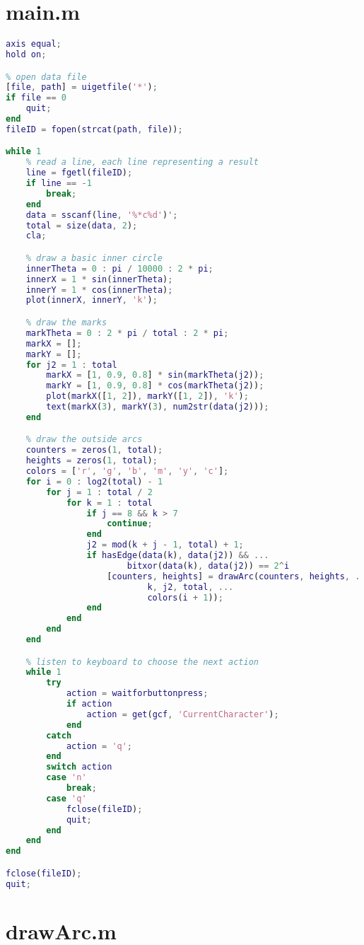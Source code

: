\label{Appendix B}

\section{main.m}
\label{Section B.1}

\begin{lstlisting}[language = Matlab]
axis equal;
hold on;

% open data file
[file, path] = uigetfile('*');
if file == 0
	quit;
end
fileID = fopen(strcat(path, file));

while 1
	% read a line, each line representing a result
	line = fgetl(fileID);
	if line == -1
		break;
	end
	data = sscanf(line, '%*c%d')';
	total = size(data, 2);
	cla;

	% draw a basic inner circle
	innerTheta = 0 : pi / 10000 : 2 * pi;
	innerX = 1 * sin(innerTheta);
	innerY = 1 * cos(innerTheta);
	plot(innerX, innerY, 'k');

	% draw the marks
	markTheta = 0 : 2 * pi / total : 2 * pi;
	markX = [];
	markY = [];
	for j2 = 1 : total
		markX = [1, 0.9, 0.8] * sin(markTheta(j2));
		markY = [1, 0.9, 0.8] * cos(markTheta(j2));
		plot(markX([1, 2]), markY([1, 2]), 'k');
		text(markX(3), markY(3), num2str(data(j2)));
	end

	% draw the outside arcs
	counters = zeros(1, total);
	heights = zeros(1, total);
	colors = ['r', 'g', 'b', 'm', 'y', 'c'];
	for i = 0 : log2(total) - 1
		for j = 1 : total / 2
			for k = 1 : total
				if j == 8 && k > 7
					continue;
				end
				j2 = mod(k + j - 1, total) + 1;
				if hasEdge(data(k), data(j2)) && ...
						bitxor(data(k), data(j2)) == 2^i
					[counters, heights] = drawArc(counters, heights, ...
							k, j2, total, ...
							colors(i + 1));
				end
			end
		end
	end

	% listen to keyboard to choose the next action
	while 1
		try
			action = waitforbuttonpress;
			if action
				action = get(gcf, 'CurrentCharacter');
			end
		catch
			action = 'q';
		end
		switch action
		case 'n'
			break;
		case 'q'
			fclose(fileID);
			quit;
		end
	end
end

fclose(fileID);
quit;
\end{lstlisting}

\clearpage
\section{drawArc.m}
\label{Section B.2}

